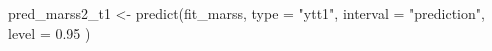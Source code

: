 \begin{Schunk}
\begin{Sinput}
 pred_marss2_t1 <- predict(fit_marss,
   type = "ytt1",
   interval = "prediction", level = 0.95
 )
\end{Sinput}
\end{Schunk}
